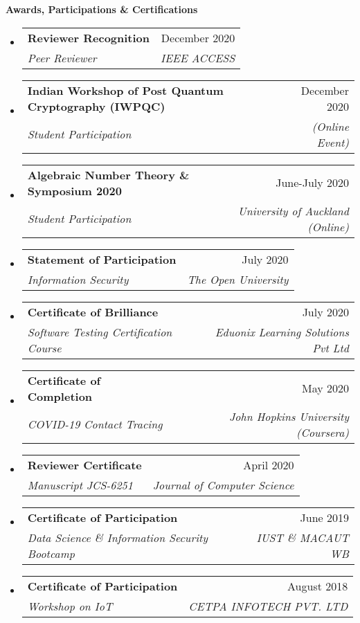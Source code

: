 \documentclass[letterpaper,12pt]{article}[leftmargin=*]
\makeatletter
\def \entryspacing {-0pt}
\renewcommand{\section}[2]{\vspace{5pt}
  \colorbox{ternary}{\color{white}\raggedbottom\normalsize\textbf{{#1}{\hspace{7pt}#2}}}
}
\newcommand{\resumeEntryStart}{\begin{itemize}[leftmargin=2.5mm]}
\newcommand{\resumeEntryEnd}{\end{itemize}\vspace{\entryspacing}}
\newcommand{\resumeEntryTSDL}[4]{
  \vspace{-1pt}\item[]
    \begin{tabularx}{0.97\textwidth}{X@{\hspace{60pt}}r}
      \textbf{\color{primary}#1} & {\firabook\color{accent}\small#2} \\
      \textit{\color{accent}\small#3} & \textit{\color{accent}\small#4} \\
    \end{tabularx}\vspace{-6pt}
}
\makeatother
\begin{document}
\section{\faCertificate}{Awards, Participations \& Certifications}
 \resumeEntryStart

\resumeEntryTSDL
      {Reviewer Recognition}{December 2020}
      {Peer Reviewer}{IEEE ACCESS} 

\resumeEntryTSDL
      {Indian Workshop of Post Quantum Cryptography (IWPQC)}{December 2020}
      {Student Participation}{(Online Event)}
\resumeEntryTSDL
      {Algebraic Number Theory \& Symposium 2020}{June-July 2020}
      {Student Participation}{University of Auckland (Online)}
\resumeEntryTSDL
      {Statement of Participation}{July 2020}
      {Information Security}{The Open University}
\resumeEntryTSDL
      {Certificate of Brilliance}{July 2020}
      {Software Testing Certification Course}{Eduonix Learning Solutions Pvt Ltd}
\resumeEntryTSDL
      {Certificate of Completion}{May 2020}
      {COVID-19 Contact Tracing}{John Hopkins University (Coursera)}
\resumeEntryTSDL
      {Reviewer Certificate}{April 2020}
      {Manuscript JCS-6251}{Journal of Computer Science}
\resumeEntryTSDL
      {Certificate of Participation}{June 2019}
      {Data Science \& Information Security Bootcamp}{IUST \& MACAUT WB}      
\resumeEntryTSDL
      {Certificate of Participation}{August 2018}
      {Workshop on IoT}{CETPA INFOTECH PVT. LTD}
      
 \resumeEntryEnd
\end{document}

